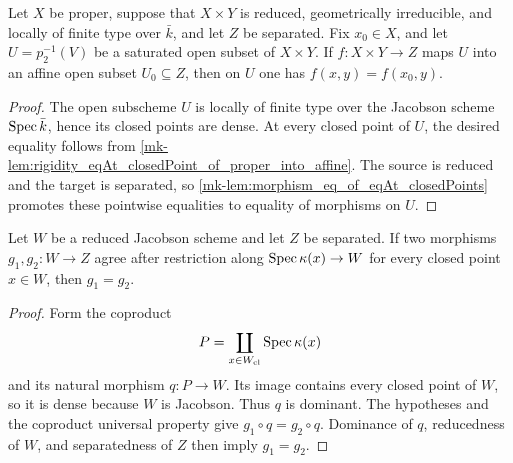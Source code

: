 \begin{lemma}
  \label{mk-lem:rigidity_eqOn_saturated_open_to_affine}
  \leanok

  Let \(X\) be proper, suppose that \(X\times Y\) is reduced, geometrically
  irreducible, and locally of finite type over \(\bar k\), and let \(Z\) be separated.
  Fix \(x_0\in X\), and let \(U=p_2^{-1}(V)\) be a saturated open subset of
  \(X\times Y\).  If \(f\colon X\times Y\to Z\) maps \(U\) into an affine open
  subset \(U_0\subseteq Z\), then on \(U\) one has \(f(x,y)=f(x_0,y)\).
\end{lemma}
\begin{proof}
  \leanok
  The open subscheme \(U\) is locally of finite type over the Jacobson scheme
  \(\operatorname{Spec}\bar k\), hence its closed points are dense.  At every closed point of
  \(U\), the desired equality follows from
  \ref{mk-lem:rigidity_eqAt_closedPoint_of_proper_into_affine}.  The source is reduced
  and the target is separated, so
  \ref{mk-lem:morphism_eq_of_eqAt_closedPoints} promotes these pointwise equalities to
  equality of morphisms on \(U\).
\end{proof}

\begin{lemma}
  \label{mk-lem:morphism_eq_of_eqAt_closedPoints}
  \leanok

  Let \(W\) be a reduced Jacobson scheme and let \(Z\) be separated.  If two
  morphisms \(g_1,g_2\colon W\to Z\) agree after restriction along
  \(\operatorname{Spec}\kappa(x)\to W\) for every closed point \(x\in W\), then \(g_1=g_2\).
\end{lemma}
\begin{proof}
  \leanok
  Form the coproduct
  \[
    P=\coprod_{x\in W_{\mathrm{cl}}}\operatorname{Spec}\kappa(x)
  \]
  and its natural morphism \(q\colon P\to W\).  Its image contains every closed
  point of \(W\), so it is dense because \(W\) is Jacobson.  Thus \(q\) is dominant.
  The hypotheses and the coproduct universal property give
  \(g_1\circ q=g_2\circ q\).  Dominance of \(q\), reducedness of \(W\), and
  separatedness of \(Z\) then imply \(g_1=g_2\).
\end{proof}

